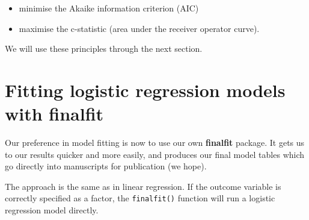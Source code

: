 \documentclass[
  12pt,
  krantz2]{krantz}
\makeatletter
\newenvironment{Shaded}{\begin{snugshade}}{\end{snugshade}}
\newcommand{\DataTypeTok}[1]{\textcolor[rgb]{0.13,0.29,0.53}{#1}}
\newcommand{\KeywordTok}[1]{\textcolor[rgb]{0.13,0.29,0.53}{\textbf{#1}}}
\newcommand{\NormalTok}[1]{#1}
\newcommand{\OperatorTok}[1]{\textcolor[rgb]{0.81,0.36,0.00}{\textbf{#1}}}
\newcommand{\OtherTok}[1]{\textcolor[rgb]{0.56,0.35,0.01}{#1}}
\newcommand{\StringTok}[1]{\textcolor[rgb]{0.31,0.60,0.02}{#1}}
\providecommand{\tightlist}{%
  \setlength{\itemsep}{0pt}\setlength{\parskip}{0pt}}
\newenvironment{kframe}{%
\medskip{}
\setlength{\fboxsep}{.8em}
 \def\at@end@of@kframe{}%
 \ifinner\ifhmode%
  \def\at@end@of@kframe{\end{minipage}}%
  \begin{minipage}{\columnwidth}%
 \fi\fi%
 \def\FrameCommand##1{\hskip\@totalleftmargin \hskip-\fboxsep
 \colorbox{shadecolor}{##1}\hskip-\fboxsep
     \hskip-\linewidth \hskip-\@totalleftmargin \hskip\columnwidth}%
 \MakeFramed {\advance\hsize-\width
   \@totalleftmargin\z@ \linewidth\hsize
   \@setminipage}}%
 {\par\unskip\endMakeFramed%
 \at@end@of@kframe}
\renewenvironment{Shaded}{\begin{kframe}}{\end{kframe}}
\makeatother
\begin{document}
\begin{itemize}
\tightlist
\item
  minimise the Akaike information criterion (AIC)
\item
  maximise the c-statistic (area under the receiver operator curve).
\end{itemize}

We will use these principles through the next section.

\hypertarget{fitting-logistic-regression-models-with-finalfit}{%
\section{Fitting logistic regression models with finalfit}\label{fitting-logistic-regression-models-with-finalfit}}

Our preference in model fitting is now to use our own \textbf{finalfit} package.
It gets us to our results quicker and more easily, and produces our final model tables which go directly into manuscripts for publication (we hope).

The approach is the same as in linear regression.
If the outcome variable is correctly specified as a factor, the \texttt{finalfit()} function will run a logistic regression model directly.

\begin{Shaded}
\end{Shaded}

\begin{table}[!h]

\caption{\label{tab:unnamed-chunk-18}Univariable logistic regression: 5-year survival from malignant melanoma by tumour ulceration (fit 1).}
\centering
{}
\end{table}
\end{document}
